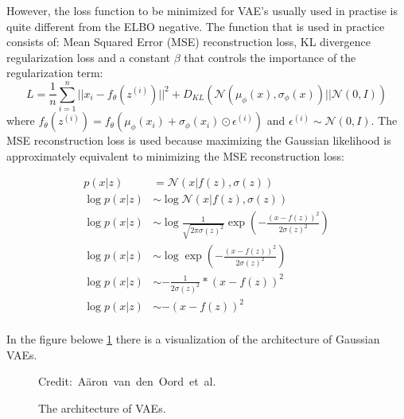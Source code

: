 However, the loss function to be minimized for VAE's usually used in practise is quite different from the ELBO negative. The function that is used in practice consists of: Mean Squared Error (MSE) reconstruction loss, KL divergence regularization loss and a constant $\beta$ that controls the importance of the regularization term:
\[ L = \frac{1}{n} \sum_{i=1}^{n} ||x_i - f_{\theta}(z^{(i)}) ||^2 + D_{KL}(\mathcal{N}(\mu_{\phi}(x), \sigma_{\phi}(x)) || \mathcal{N}(0, I)) \]
where $f_{\theta}(z^{(i)}) = f_{\theta}(\mu_{\phi}(x_i) + \sigma_{\phi}(x_i) \odot \epsilon^{(i)})$ and $\epsilon^{(i)} \sim \mathcal{N}(0, I)$. The MSE reconstruction loss is used because maximizing the Gaussian likelihood is approximately equivalent to minimizing the MSE reconstruction loss:

\begin{equation} \label{eqMSE}
    \begin{split}
        p(x|z) &= \mathcal{N}(x|f(z), \sigma(z)) \\
        \log p(x|z) &\sim  \log \mathcal{N}(x|f(z), \sigma(z)) \\
        \log p(x|z) &\sim  \log \frac{1}{\sqrt{2 \pi \sigma(z)^2}} \exp(-\frac{(x - f(z))^2}{2 \sigma(z)^2}) \\
        \log p(x|z) &\sim  \log \exp(-\frac{(x - f(z))^2}{2 \sigma(z)^2}) \\
        \log p(x|z) &\sim  - \frac{1}{2 \sigma(z)^2} * (x - f(z))^2 \\
        \log p(x|z) &\sim  -  (x - f(z))^2 \\
    \end{split}
\end{equation}

In the figure belowe \ref{VAEFigure} there is a visualization of the architecture of Gaussian VAEs.


\begin{figure}[H]
    \centering

    \caption{ The architecture of VAEs.}
  	\medskip 
	\hspace*{15pt}\hbox{\scriptsize Credit: Aäron van den Oord et al.}
    \label{VAEFigure}
\end{figure}

